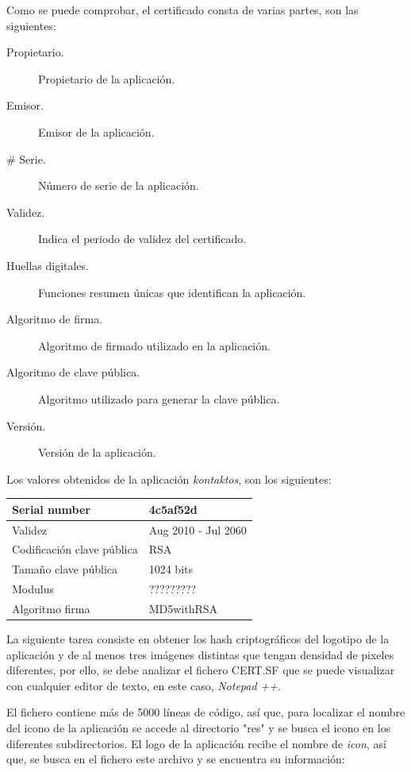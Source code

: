 \documentclass[a4paper,11pt,oneside]{book}
\begin{document}
Como se puede comprobar, el certificado consta de varias partes, son las siguientes:

\begin{description}
\item[Propietario.] Propietario de la aplicación.
\item[Emisor.] Emisor de la aplicación.
\item[\#{} Serie.] Número de serie de la aplicación.
\item[Validez.] Indica el periodo de validez del certificado.
\item[Huellas digitales.] Funciones resumen únicas que identifican la aplicación.
\item[Algoritmo de firma.] Algoritmo de firmado utilizado en la aplicación.
\item[Algoritmo de clave pública.] Algoritmo utilizado para generar la clave pública.
\item[Versión.] Versión de la aplicación.
\end{description}

Los valores obtenidos de la aplicación \emph{kontaktos}, son los siguientes:


\begin{table}[h]
		\centering
		\begin{tabular}{|l|l|}
		\hline Serial number & 4c5af52d \\
		\hline Validez & Aug 2010 - Jul 2060 \\
		\hline Codificación clave pública & RSA \\
		\hline Tamaño clave pública & 1024 bits \\
		\hline Modulus & ?????????\\
		\hline Algoritmo firma & MD5withRSA \\
		\hline
		\end{tabular}	
\end{table}


La siguiente tarea consiste en obtener los hash criptográficos del logotipo de la aplicación y de al menos tres imágenes distintas que tengan densidad de pixeles diferentes, por ello, se debe analizar el fichero CERT.SF que se puede visualizar con cualquier editor de texto, en este caso, \emph{Notepad ++}. 

El fichero contiene más de 5000 líneas de código, así que, para localizar el nombre del icono de la aplicación se accede al directorio "res" y se busca el icono en los diferentes subdirectorios. El logo de la aplicación recibe el nombre de \emph{icon}, así que, se busca en el fichero este archivo y se encuentra su información:
\end{document}
